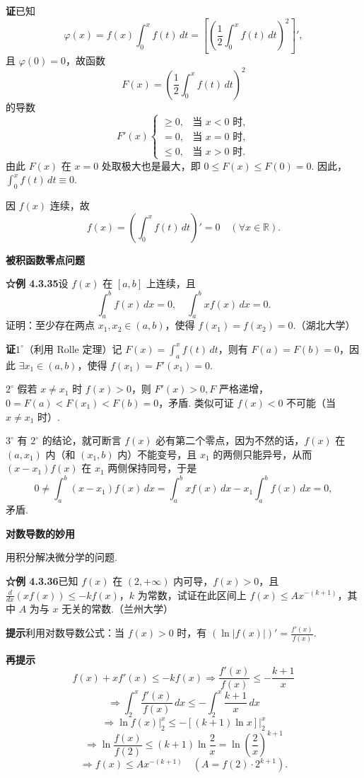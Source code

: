 \documentclass[UTF8, 12pt, fontset=fandol, oneside]{ctexart}
\begin{document}
\noindent\textbf{证}\quad 已知
\[
\varphi(x)=f(x)\int_0^x f(t)\,dt
=\left[\left(\frac12\int_0^x f(t)\,dt\right)^2\right]',
\]
且 $\varphi(0)=0$，故函数
\[
F(x)=\left(\frac12\int_0^x f(t)\,dt\right)^2
\]
的导数
\[
F'(x)
\begin{cases}
\ge0, & \text{当 }x<0\text{ 时},\\
=0, & \text{当 }x=0\text{ 时},\\
\le0, & \text{当 }x>0\text{ 时}.
\end{cases}
\]
由此 $F(x)$ 在 $x=0$ 处取极大也是最大，即 $0\le F(x)\le F(0)=0$. 因此，$\int_0^x f(t)\,dt\equiv0$.

因 $f(x)$ 连续，故
\[
f(x)=\left(\int_0^x f(t)\,dt\right)'=0\quad(\forall x\in\mathbb{R}).
\]

\noindent\textbf{被积函数零点问题}

\noindent\textbf{☆例 4.3.35}\quad 设 $f(x)$ 在 $[a,b]$ 上连续，且
\[
\int_a^b f(x)\,dx=0,\quad \int_a^b xf(x)\,dx=0.
\]
证明：至少存在两点 $x_1,x_2\in(a,b)$，使得 $f(x_1)=f(x_2)=0$.（湖北大学）

\noindent\textbf{证}\quad $1^\circ$（利用 Rolle 定理）记 $F(x)=\int_a^x f(t)\,dt$，则有 $F(a)=F(b)=0$，因此 $\exists x_1\in(a,b)$，使得 $f(x_1)=F'(x_1)=0$.

\noindent $2^\circ$ 假若 $x\ne x_1$ 时 $f(x)>0$，则 $F'(x)>0,F$ 严格递增，$0=F(a)<F(x_1)<F(b)=0$，矛盾. 类似可证 $f(x)<0$ 不可能（当 $x\ne x_1$ 时）.

\noindent $3^\circ$ 有 $2^\circ$ 的结论，就可断言 $f(x)$ 必有第二个零点，因为不然的话，$f(x)$ 在 $(a,x_1)$ 内（和 $(x_1,b)$ 内）不能变号，且 $x_1$ 的两侧只能异号，从而 $(x-x_1)f(x)$ 在 $x_1$ 两侧保持同号，于是
\[
0\ne\int_a^b(x-x_1)f(x)\,dx
=\int_a^b xf(x)\,dx-x_1\int_a^b f(x)\,dx=0,
\]
矛盾.

\noindent\textbf{对数导数的妙用}

\noindent 用积分解决微分学的问题.

\noindent\textbf{☆例 4.3.36}\quad 已知 $f(x)$ 在 $(2,+\infty)$ 内可导，$f(x)>0$，且 $\frac{d}{dx}(xf(x))\le-kf(x)$，$k$ 为常数，试证在此区间上 $f(x)\le Ax^{-(k+1)}$，其中 $A$ 为与 $x$ 无关的常数.（兰州大学）

\noindent\textbf{提示}\quad 利用对数导数公式：当 $f(x)>0$ 时，有 $(\ln|f(x)|)'=\frac{f'(x)}{f(x)}$.

\noindent\textbf{再提示}\quad
\[
f(x)+xf'(x)\le-kf(x)
\Rightarrow\frac{f'(x)}{f(x)}\le-\frac{k+1}{x}
\]
\[
\Rightarrow\int_2^x\frac{f'(x)}{f(x)}\,dx
\le-\int_2^x\frac{k+1}{x}\,dx
\]
\[
\Rightarrow \ln f(x)\bigg|_2^x
\le-[(k+1)\ln x]\bigg|_2^x
\]
\[
\Rightarrow\ln\frac{f(x)}{f(2)}
\le(k+1)\ln\frac2x
=\ln\left(\frac2x\right)^{k+1}
\]
\[
\Rightarrow f(x)\le Ax^{-(k+1)}
\quad(A=f(2)\cdot2^{k+1}).
\]
\end{document}
